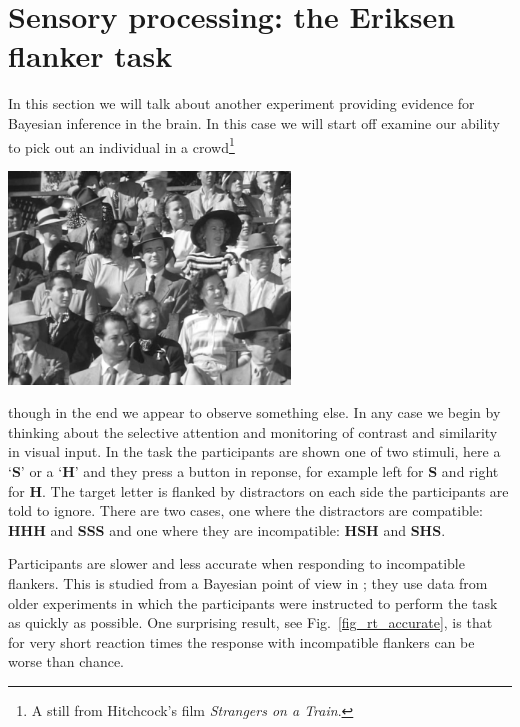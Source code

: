 \documentclass[12pt]{article}
\begin{document}
\section*{Sensory processing: the Eriksen flanker task}

In this section we will talk about another experiment providing
evidence for Bayesian inference in the brain. In this case we will
start off examine our ability to pick out an individual in a crowd\footnote{A still from Hitchcock's film \textsl{Strangers on a Train}.}
\begin{center}
\includegraphics[width=7.5cm]{Strangers_on_a_Train.png}
\end{center}
though in the end we appear to observe something else. In any case we
begin by thinking about the selective attention and monitoring of
contrast and similarity in visual input. In the task the participants
are shown one of two stimuli, here a \lq{}\textbf{S}\rq{} or a
\lq{}\textbf{H}\rq{} and they press a button in reponse, for example
left for \textbf{S} and right for \textbf{H}. The target letter is
flanked by distractors on each side the participants are told to
ignore. There are two cases, one where the distractors are compatible:
\textbf{HHH} and \textbf{SSS} and one where they are incompatible:
\textbf{HSH} and \textbf{SHS}.

Participants are slower and less accurate when responding to
incompatible flankers. This is studied from a Bayesian point of view
in \cite{YuDayanCohen2009}; they use data from older experiments in
which the participants were instructed to perform the task as quickly
as possible. One surprising result, see Fig.~\ref{fig_rt_accurate}, is
that for very short reaction times the response with incompatible
flankers can be worse than chance.
\end{document}

